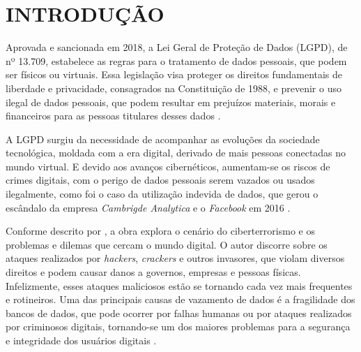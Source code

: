 \documentclass[
	12pt,				%
	openright,			%
	oneside,			%
	a4paper,			%
	english,			%
	french,				%
	spanish,			%
	brazil,				%
	]{abntex2}
\begin{document}

\tableofcontents*



\textual
\setcounter{page}{1}
\chapter*{INTRODUÇÃO}
\label{chapter:introducao}
Aprovada e sancionada em 2018, a Lei Geral de Proteção de Dados (LGPD), de nº 13.709, estabelece as regras para o tratamento de dados pessoais, que podem ser físicos ou virtuais. Essa legislação visa proteger os direitos fundamentais de liberdade e privacidade, consagrados na Constituição de 1988, e prevenir o uso ilegal de dados pessoais, que podem resultar em prejuízos materiais, morais e financeiros para as pessoas titulares desses dados \cite{01-01-LeiGeral}. 

A LGPD surgiu da necessidade de acompanhar as evoluções da sociedade tecnológica, moldada com a era digital, derivado de mais pessoas conectadas no mundo virtual. E devido aos avanços cibernéticos, aumentam-se os riscos de crimes digitais, com o perigo de dados pessoais serem vazados ou usados ilegalmente, como foi o caso da utilização indevida de dados, que gerou o escândalo da empresa \textit{Cambrigde Analytica} e o \textit{Facebook} em 2016 \cite{01-03-OlharDigital}. 

Conforme descrito por , a obra explora o cenário do ciberterrorismo e os problemas e dilemas que cercam o mundo digital. O autor discorre sobre os ataques realizados por \textit{hackers}, \textit{crackers} e outros invasores,  que violam diversos direitos e podem causar danos a governos, empresas e pessoas físicas. Infelizmente, esses ataques maliciosos estão se tornando cada vez mais frequentes e rotineiros. Uma das principais causas de vazamento de dados é a fragilidade dos bancos de dados, que pode ocorrer por falhas humanas ou por ataques realizados por criminosos digitais, tornando-se um dos maiores problemas para a segurança e integridade dos usuários digitais \cite{01-06-Dodsworth2021}.
\end{document}
